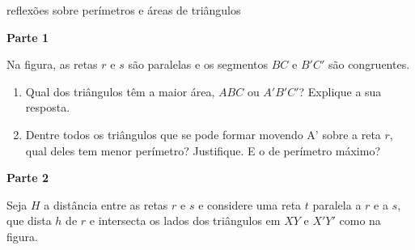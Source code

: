 \practice{}
\label{\detokenize{GE504-10::doc}}\label{\detokenize{GE504-10:praticando}}
\begin{task}{reflexões sobre perímetros e áreas de triângulos}



\textbf{Parte 1}

Na figura, as retas \(r\) e \(s\) são paralelas e os segmentos \(BC\) e \(B'C'\) são congruentes.

\begin{figure}[H]
\centering

\end{figure}
\begin{enumerate}
\item {} 
Qual dos triângulos têm a maior área, \(ABC\) ou \(A'B'C'\)? Explique a sua resposta.

\item {} 
Dentre todos os triângulos que se pode formar movendo A’  sobre a reta \(r\), qual deles tem menor perímetro? Justifique. E o de perímetro máximo?

\end{enumerate}

\textbf{Parte 2}

Seja \(H\) a distância entre as retas \(r\) e \(s\) e considere uma reta \(t\) paralela a \(r\) e a \(s\), que dista \(h\) de \(r\) e intersecta os lados dos triângulos em \(XY\) e \(X'Y'\) como na figura.


\end{task}
